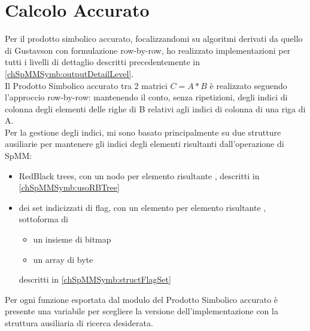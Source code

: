\section{Calcolo Accurato}
Per il prodotto simbolico accurato, focalizzandomi su algoritmi derivati 
da quello di Gustavson \cite{gustavson} con formulazione row-by-row,
ho realizzato implementazioni per tutti i livelli di dettaglio descritti precedentemente in \ref{chSpMMSymb:outputDetailLevel}.\\
Il Prodotto Simbolico accurato tra 2 matrici $C=A*B$ è realizzato seguendo l'approccio row-by-row: 
mantenendo il conto, senza ripetizioni, degli indici di colonna degli elementi \nnz delle righe di B relativi agli indici di colonna di una riga di A.\\
Per la gestione degli indici, mi sono basato principalmente su due strutture ausiliarie per mantenere 
gli indici degli elementi \nnz risultanti dall'operazione di SpMM:\\
\begin{itemize}
	\item RedBlack trees, con un nodo per elemento risultante \nnz, descritti in \ref{chSpMMSymb:usoRBTree}
	\item dei set indicizzati di flag, con un elemento  per elemento risultante \nnz, 
	sottoforma di
	\begin{itemize}
		\item un insieme di bitmap 
		\item un array di byte
	\end{itemize}
	descritti in \ref{chSpMMSymb:structFlagSet}
\end{itemize}
Per ogni funzione esportata dal modulo del Prodotto Simbolico accurato è presente una variabile 
per scegliere la versione dell'implementazione con la struttura ausiliaria di ricerca desiderata.\\

